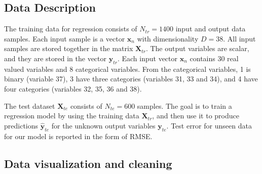 \documentclass{article} %
\begin{document}
\subsection{Data Description}

The training data for regression consists of $N_{tr}=1400$ input and output data samples. 
Each input sample is a vector $\mathbf{x}_n$ with dimensionality $D=38$. 
All input samples are stored together in the matrix $\mathbf{X}_{tr}$. 
The output variables are scalar, and they are stored in the vector $\mathbf{y}_{tr}$. 
Each input vector $\mathbf{x}_n$ contains 30 real valued variables and 8 categorical variables. 
From the categorical variables, 1 is binary (variable 37), 3 have three 
categories (variables 31, 33 and 34), and 4 have four categories (variables 32, 35, 36 and 38).

The test dataset $\mathbf{X}_{te}$ consists of $N_{te}=600$ samples.
The goal is to train a regression model by using the training data $\mathbf{X}_{tr}$, and 
then use it to produce predictions $\mathbf{\hat{y}}_{te}$ for the unknown
output variables $\mathbf{y}_{te}$. 
Test error for unseen data for our model is reported in the form of RMSE.

\subsection{Data visualization and cleaning}
\end{document}
